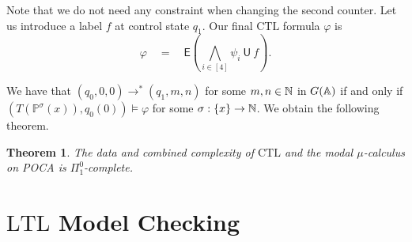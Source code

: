 \documentclass[times,envcountsame]{llncs}
\newtheorem{theorem}{{\bf Theorem}}[section]
\renewcommand{\mod}{\text{mod }}
\def\CTL{{\text{CTL}}}
\def\div{{\mathrm{div}}}
\def\U{{\mathsf{U}}}
\def\E{{\mathsf{E}}}
\newcommand{\naturals}{\ensuremath{\mathbf{N}}}
\newcommand{\Poca}{\mathbb{P}}
\newcommand{\ltl}{\text{LTL}}
\newcommand{\ctl}{\text{CTL}}
\begin{document}
\noindent
Note that we do not need any constraint when changing the second counter.
Let us introduce a label $f$ at control state $q_1$.
Our final $\ctl$ formula $\varphi$ is
$$
\varphi\quad=\quad\E\left(\bigwedge_{i\in[4]}\psi_i\ \U\  f\right).
$$
\iffalse
The correctness of the reduction follows from the following equivalences:
\begin{itemize}
\item $(T(\Poca),(q_0,0))\models \neg \varphi$
\item for all $\sigma:\{x\}\rightarrow \N$ we have $(\Poca^\sigma(x),q_0(0))\not\models\varphi$
\item for some $\sigma:\{x\}\rightarrow\N$ we have $(\Poca^\sigma(x),q_0(0))\models\varphi$
\item for some $\exists\sigma:\{x\}\rightarrow\N$ there is some path
$r_0(0)\rightarrow r_1(n_1)\cdots r_k(n_k)$ such that
$r_0=q_0$, $r_k=q_1$, $r_k\in F$ and
$(T(\Poca^\sigma(x)),r_i(n_i)





\end{itemize}
Then there is an assignment
$\sigma$ such that $(T(\Poca^\sigma),(q_0,0))\models \varphi$. It is
easily verified that the witnessing path $(q,0)(q_1,n_1)\ldots
(q',n')$ in $T(\A'(\sigma))$ corresponds to the path
$(q,0,0)(q_1,n_1\mod \sigma(x), n_1\div \sigma(x))\ldots (q',n'\mod
\sigma(x), n'\div \sigma(x))$ in $T(\A)$. Conversely, if
$(q,0,0)\rightarrow^* (q,n_1,n_2)$ in $T(\A)$, then the first counter
of $\A$ does not exceed some value $u \in \naturals$. Consequently, by
setting $\sigma(x):=u$, $(T(\A(\sigma)),(q,0))\models \varphi$.
\fi
We have that $(q_0,0,0)\rightarrow^*(q_1,m,n)$ for some $m,n\in\mathbb{N}$ in $G(\mathbb{A})$  if and only
if
$(T(\Poca^\sigma(x)),q_0(0))\models\varphi$ for some
$\sigma:\{x\}\rightarrow\mathbb{N}$.
We obtain the following theorem.

\begin{theorem}
  The data and combined complexity of $\CTL$ and the modal $\mu$-calculus
 on POCA is $\Pi^0_1$-complete.
\end{theorem}




\section{$\ltl$ Model Checking}{\label{S LTL}}
\end{document}
